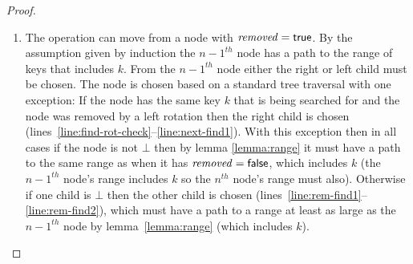 \begin{proof}
\begin{itemize}
\begin{enumerate}
\item The operation can move from a node with $\ms{removed}=\lit{true}$.
By the assumption given by induction the $n-1^{th}$ node has a path to the range of keys that includes $k$.
From the $n-1^{th}$ node either the right or left child must be chosen.
The node is chosen based on a standard tree traversal with one exception:
If the node has the same key $k$ that is being searched for and the node was removed by a left rotation then the right child is chosen (lines~\ref{line:find-rot-check}--\ref{line:next-find1}).
With this exception then in all cases if the node is not $\bot$ then by lemma \ref{lemma:range} it must have a path to the same range as when it has $\ms{removed}=\lit{false}$, which includes $k$
(the $n-1^{th}$ node's range includes $k$ so the $n^{th}$ node's range must also).
Otherwise if one child is $\bot$ then the other child is chosen (lines~\ref{line:rem-find1}--\ref{line:rem-find2}), which must have a path to a range at
least as large as the $n-1^{th}$ node by lemma~\ref{lemma:range} (which includes $k$).
\end{enumerate}
\end{itemize}
\end{proof}

